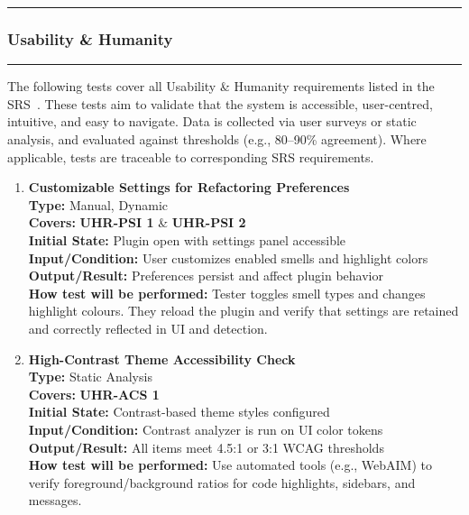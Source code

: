 \documentclass[12pt, titlepage]{article}
\newcommand{\colorrule}{\textcolor{BlueViolet}{\rule{\linewidth}{2pt}}}
\begin{document}
\noindent\colorrule

\subsubsection{Usability \& Humanity}
\colorrule

\medskip

\noindent
The following tests cover all Usability \& Humanity requirements listed in the SRS~\cite{SRS}. These tests aim to validate that the system is accessible, user-centred, intuitive, and easy to navigate. Data is collected via user surveys or static analysis, and evaluated against thresholds (e.g., 80–90\% agreement). Where applicable, tests are traceable to corresponding SRS requirements.

\begin{enumerate}[label={\bf \textcolor{Maroon}{test-UH-\arabic*}}, wide=0pt, font=\itshape]

  \item \textbf{Customizable Settings for Refactoring Preferences} \\[2mm]
    \textbf{Type:} Manual, Dynamic \\
    \textbf{Covers:} \textbf{UHR-PSI 1} \& \textbf{UHR-PSI 2} \\ 
    \textbf{Initial State:} Plugin open with settings panel accessible \\
    \textbf{Input/Condition:} User customizes enabled smells and highlight colors \\
    \textbf{Output/Result:} Preferences persist and affect plugin behavior \\[2mm]
    \textbf{How test will be performed:} Tester toggles smell types and changes highlight colours. They reload the plugin and verify that settings are retained and correctly reflected in UI and detection.

  \item \textbf{High-Contrast Theme Accessibility Check} \\[2mm]
    \textbf{Type:} Static Analysis \\
    \textbf{Covers:} \textbf{UHR-ACS 1} \\ 
    \textbf{Initial State:} Contrast-based theme styles configured \\
    \textbf{Input/Condition:} Contrast analyzer is run on UI color tokens \\
    \textbf{Output/Result:} All items meet 4.5:1 or 3:1 WCAG thresholds \\[2mm]
    \textbf{How test will be performed:} Use automated tools (e.g., WebAIM) to verify foreground/background ratios for code highlights, sidebars, and messages.


\end{enumerate}
\end{document}
